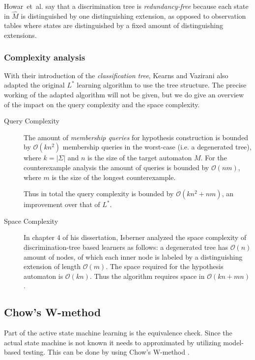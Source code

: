 \documentclass[multi,crop=false,class=article]{standalone}
\begin{document}
Howar~et~al. say that a discrimination tree is \textit{redundancy-free} because
each state in $\hat M$ is distinguished by one distinguishing extension, as
opposed to observation tables where states are distinguished by a fixed amount
of distinguishing extensions\cite{Howar14}.

\subsubsection{Complexity analysis}
\label{sec:complexity-analysis}
With their introduction of the \textit{classification tree}, Kearns and Vazirani
also adapted the original $L^*$ learning algorithm to use the tree
structure\cite{Kearns94}. The precise working of the adapted algorithm will not
be given, but we do give an overview of the impact on the query complexity and
the space complexity.

\begin{description}
\item[Query Complexity] The amount of \textit{membership queries} for hypothesis
  construction is bounded by $\mathcal{O}(kn^2)$ membership queries in the
  worst-case (i.e. a degenerated tree)\cite{Howar14,Kearns94,Isberner14b}, where
  $k = |\Sigma |$ and $n$ is the size of the target automaton $M$. For the
  counterexample analysis the amount of queries is bounded by $\mathcal{O}(nm)$,
  where $m$ is the size of the longest counterexample\cite{Kearns94}.

  Thus in total the query complexity is bounded by $\mathcal{O}(kn^2 + nm)$, an
  improvement over that of $L^*$.
\item[Space Complexity] In chapter 4 of his dissertation, Isberner analyzed the
  space complexity of discrimination-tree based learners as follows: a
  degenerated tree has $\mathcal{O}(n)$ amount of nodes, of which each inner
  node is labeled by a distinguishing extension of length
  $\mathcal{O}(m)$\cite{Isberner15}.  The space required for the hypothesis
  automaton is $\mathcal{O}(kn)$\cite{Isberner15}. Thus the algorithm requires
  space in $\mathcal{O}(kn + mn)$\cite{Isberner14b,Isberner15}.
\end{description}

\subsection{Chow's W-method}
Part of the active state machine learning is the equivalence check.
Since the actual state machine is not known it needs to approximated by
utilizing model-based testing.
This can be done by using Chow's W-method \cite{deRuiter15, Chow78}.
\end{document}
